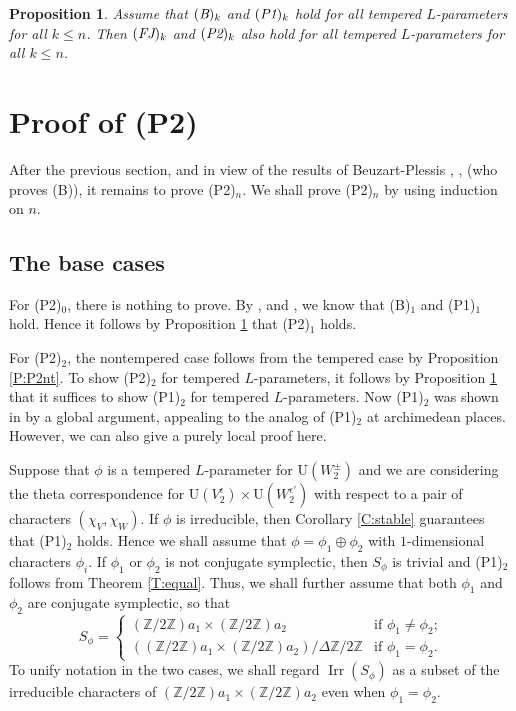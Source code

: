 \documentclass[11pt]{amsart}
\numberwithin{equation}{section}
\theoremstyle{plain}
\newtheorem{prop}[thm]{Proposition}
\theoremstyle{definition}
\theoremstyle{remark}
\def\Irr{\operatorname{Irr}}
\def\U{\mathrm{U}}
\def\ZZ{\mathbb{Z}}
\begin{document}
\begin{prop}  \label{P:BP1-FJP2}
Assume that $(\emph{B})_k$ and $(\emph{P1})_k$ hold for all tempered $L$-parameters for all $k \le n$. Then $(\emph{FJ})_k$ and $(\emph{P2})_k$ also hold for all tempered $L$-parameters for all $k \le n$.
\end{prop}

\section{\textbf{Proof of (P2)}}

After the previous section, and in view of the results of Beuzart-Plessis \cite{bp1}, \cite{bp2}, \cite{bp3} (who proves (B)), it remains to prove (P2)$_n$. We shall prove (P2)$_n$ by using induction on $n$. 

\subsection{The base cases}

For (P2)$_0$, there is nothing to prove. By \cite{hks}, \cite{ggp2} and \cite{bp2}, we know that (B)$_1$ and (P1)$_1$ hold. Hence it follows by Proposition \ref{P:BP1-FJP2} that (P2)$_1$ holds.

For (P2)$_2$, the nontempered case follows from the tempered case by Proposition \ref{P:P2nt}. To show (P2)$_2$ for tempered $L$-parameters, it follows by Proposition \ref{P:BP1-FJP2} that it suffices to  show (P1)$_2$ for tempered $L$-parameters. Now (P1)$_2$ was shown in \cite[Theorem 11.2]{ggp2} by a global argument, appealing to the analog of (P1)$_2$ at archimedean places. However, we can also give a purely local proof here.

Suppose that $\phi$ is a tempered $L$-parameter for $\U(W_2^{\pm})$ and we are considering the theta correspondence for $\U(V_2^{\epsilon}) \times \U(W_2^{\epsilon'})$ with respect to a pair of characters $(\chi_V, \chi_W)$. If $\phi$ is irreducible, then Corollary \ref{C:stable} guarantees that (P1)$_2$ holds. Hence we shall assume that $\phi = \phi_1 \oplus \phi_2$ with $1$-dimensional characters $\phi_i$. If $\phi_1$ or $\phi_2$ is not conjugate symplectic, then $S_\phi$ is trivial and (P1)$_2$ follows from Theorem \ref{T:equal}. Thus, we shall further assume that both $\phi_1$ and $\phi_2$ are conjugate symplectic, so that
\[  S_{\phi}  = \begin{cases}
 (\ZZ/2\ZZ)a_1 \times (\ZZ/2\ZZ) a_2  &  \text{if $\phi_1 \ne \phi_2$;} \\ 
 ((\ZZ/2\ZZ) a_1 \times (\ZZ/2\ZZ) a_2 ) / \Delta \ZZ/2\ZZ  & \text{if $\phi_1  = \phi_2$.} \end{cases} \]
To unify notation in the two cases, we shall regard $\Irr(S_{\phi})$ as a subset of the irreducible characters of $(\ZZ/2\ZZ) a_1 \times (\ZZ /2\ZZ) a_2$ even when $\phi_1 = \phi_2$.
\end{document}
